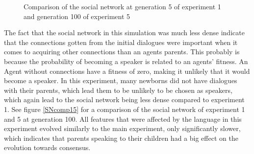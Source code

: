 \begin{figure}
    \centering
    \hfill
    \caption{Comparison of the social network at generation 5 of experiment 1 and generation 100 of experiment 5}
    \label{fig:SNComparison}
\end{figure}

The fact that the social network in this simulation was much less dense indicate that the connections gotten from the initial dialogues were important when it comes to acquiring other connections than an agents parents. This probably is because the probability of becoming a speaker is related to an agents' fitness. An Agent without connections have a fitness of zero, making it unlikely that it would become a speaker. In this experiment, many newborns did not have dialogues with their parents, which lead them to be unlikely to be chosen as speakers, which again lead to the social network being less dense compared to experiment 1. See figure \ref{SNcomp15} for a comparison of the social network of experiment 1 and 5 at generation 100. All features that were affected by the language in this experiment evolved similarly to the main experiment, only significantly slower, which indicates that parents speaking to their children had a big effect on the evolution towards consensus.

